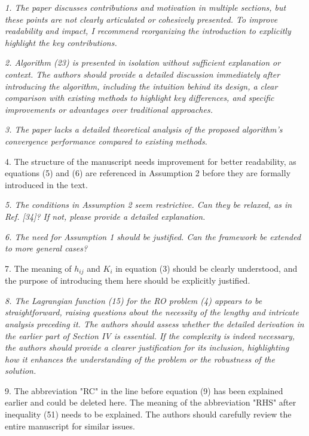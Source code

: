 \documentclass[journal,twoside,web]{ieeecolor}
\begin{document}
\textcolor{reviewerred}{\textit{1. The paper discusses contributions and motivation in multiple sections, but these points are not clearly articulated or cohesively presented. To improve readability and impact, I recommend reorganizing the introduction to explicitly highlight the key contributions.}}

\textcolor{reviewerred}{\textit{2. Algorithm (23) is presented in isolation without sufficient explanation or context. The authors should provide a detailed discussion immediately after introducing the algorithm, including the intuition behind its design, a clear comparison with existing methods to highlight key differences, and specific improvements or advantages over traditional approaches.}}

\textcolor{reviewerred}{\textit{3. The paper lacks a detailed theoretical analysis of the proposed algorithm's convergence performance compared to existing methods.}}

4. The structure of the manuscript needs improvement for better readability, as equations (5) and (6) are referenced in Assumption 2 before they are formally introduced in the text.

\textcolor{reviewerred}{\textit{5. The conditions in Assumption 2 seem restrictive. Can they be relaxed, as in Ref. [34]? If not, please provide a detailed explanation.}}

\textcolor{reviewerred}{\textit{6. The need for Assumption 1 should be justified. Can the framework be extended to more general cases?}}

7. The meaning of $h_{ij}$ and $K_i$ in equation (3) should be clearly understood, and the purpose of introducing them here should be explicitly justified.

\textcolor{reviewerred}{\textit{8. The Lagrangian function (15) for the RO problem (4) appears to be straightforward, raising questions about the necessity of the lengthy and intricate analysis preceding it. The authors should assess whether the detailed derivation in the earlier part of Section IV is essential. If the complexity is indeed necessary, the authors should provide a clearer justification for its inclusion, highlighting how it enhances the understanding of the problem or the robustness of the solution.}}

9. The abbreviation "RC" in the line before equation (9) has been explained earlier and could be deleted here. The meaning of the abbreviation "RHS" after inequality (51) needs to be explained. The authors should carefully review the entire manuscript for similar issues.
\end{document}
